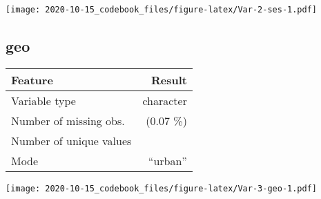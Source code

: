 \documentclass[
]{article}
\begin{document}
\begin{minipage}{0.25 \textwidth}

\texttt{[image: 2020-10-15\_codebook\_files/figure-latex/Var-2-ses-1.pdf]}

\end{minipage}

\noindent\makebox[\linewidth]{\rule{\textwidth}{0.4pt}}

\hypertarget{geo}{%
\subsection{geo}\label{geo}}

\begin{minipage}{0.75 \textwidth}

\begin{longtable}[]{@{}lr@{}}
\toprule
\begin{minipage}[b]{0.34\columnwidth}\raggedright
Feature\strut
\end{minipage} & \begin{minipage}[b]{0.17\columnwidth}\raggedleft
Result\strut
\end{minipage}\tabularnewline
\midrule
\endhead
\begin{minipage}[t]{0.34\columnwidth}\raggedright
Variable type\strut
\end{minipage} & \begin{minipage}[t]{0.17\columnwidth}\raggedleft
character\strut
\end{minipage}\tabularnewline
\begin{minipage}[t]{0.34\columnwidth}\raggedright
Number of missing obs.\strut
\end{minipage} & \begin{minipage}[t]{0.17\columnwidth}\raggedleft
4 (0.07 \%)\strut
\end{minipage}\tabularnewline
\begin{minipage}[t]{0.34\columnwidth}\raggedright
Number of unique values\strut
\end{minipage} & \begin{minipage}[t]{0.17\columnwidth}\raggedleft
2\strut
\end{minipage}\tabularnewline
\begin{minipage}[t]{0.34\columnwidth}\raggedright
Mode\strut
\end{minipage} & \begin{minipage}[t]{0.17\columnwidth}\raggedleft
``urban''\strut
\end{minipage}\tabularnewline
\bottomrule
\end{longtable}

\end{minipage}
\begin{minipage}{0.25 \textwidth}

\texttt{[image: 2020-10-15\_codebook\_files/figure-latex/Var-3-geo-1.pdf]}

\end{minipage}
\end{document}
